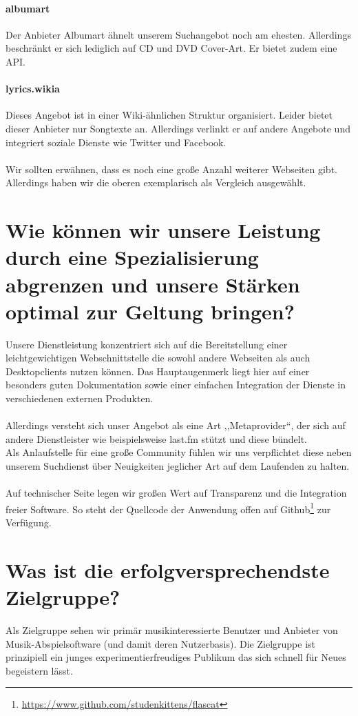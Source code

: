 \paragraph{albumart}
Der Anbieter Albumart ähnelt unserem Suchangebot noch am ehesten. Allerdings
beschränkt er sich lediglich auf CD und DVD Cover-Art. Er bietet zudem eine API.

\paragraph{lyrics.wikia}
Dieses Angebot ist in einer Wiki-ähnlichen Struktur organisiert. Leider bietet
dieser Anbieter nur Songtexte an. Allerdings verlinkt er auf andere Angebote und
integriert soziale Dienste wie Twitter und Facebook.
\\
\\
Wir sollten erwähnen, dass es noch eine große Anzahl weiterer Webseiten gibt.
Allerdings haben wir die oberen exemplarisch als Vergleich ausgewählt.

\section{Wie können wir unsere Leistung durch eine Spezialisierung abgrenzen und unsere Stärken optimal zur Geltung bringen?}
Unsere Dienstleistung konzentriert sich auf die Bereitstellung einer
leichtgewichtigen Webschnittstelle die sowohl andere Webseiten als auch
Desktopclients nutzen können. Das Hauptaugenmerk liegt hier auf einer besonders
guten Dokumentation sowie einer einfachen Integration der Dienste in
verschiedenen externen Produkten.
\\
\\
Allerdings versteht sich unser Angebot als eine Art ,,Metaprovider``, der sich
auf andere Dienstleister wie beispielsweise last.fm stützt und diese bündelt.
\\
Als Anlaufstelle für eine große Community fühlen wir uns verpflichtet diese
neben unserem Suchdienst über Neuigkeiten jeglicher Art auf dem Laufenden zu
halten.
\\
\\
Auf technischer Seite legen wir großen Wert auf Transparenz und die Integration
freier Software. So steht der Quellcode der Anwendung offen auf Github\footnote{\url{https://www.github.com/studenkittens/flascat}} zur
Verfügung. 



\section{Was ist die erfolgversprechendste Zielgruppe?}
Als Zielgruppe sehen wir primär musikinteressierte Benutzer und Anbieter von
Musik-Abspielsoftware (und damit deren Nutzerbasis).
Die Zielgruppe ist prinzipiell ein junges experimentierfreudiges Publikum das
sich schnell für Neues begeistern lässt.

